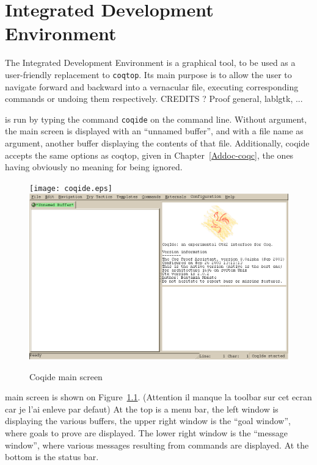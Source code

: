 \chapter{\Coq{} Integrated Development Environment}

The \Coq{} Integrated Development Environment is a graphical tool, to
be used as a user-friendly replacement to \texttt{coqtop}. Its main
purpose is to allow the user to navigate forward and backward into a
\Coq{} vernacular file, executing corresponding commands or undoing
them respectively. CREDITS ? Proof general, lablgtk, ...

\coqide{} is run by typing the command \verb|coqide| on the command
line. Without argument, the main screen is displayed with an ``unnamed
buffer'', and with a file name as argument, another buffer displaying
the contents of that file. Additionally, coqide accepts the same
options as coqtop, given in Chapter~\ref{Addoc-coqc}, the ones having
obviously no meaning for \coqide{} being ignored.

\begin{figure}[t]
\begin{center}
\ifx\pdftexversion\undefined   %
\texttt{[image: coqide.eps]}
\else
\includegraphics[width=1.0\textwidth]{coqide.png}
\fi
\end{center}
\caption{Coqide main screen}
\label{fig:coqide}
\end{figure}

\coqide{} main screen is shown on Figure~\ref{fig:coqide}.  (Attention
il manque la toolbar sur cet ecran car je l'ai enleve par defaut) At
the top is a menu bar, the left window is displaying the various
buffers, the upper right window is the ``goal window'', where goals to
prove are displayed. The lower right window is the ``message window'',
where various messages resulting from commands are displayed. At the
bottom is the status bar.

